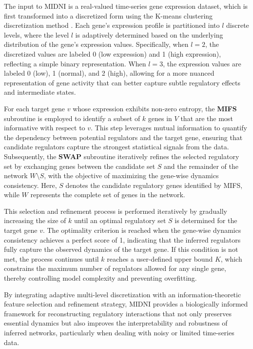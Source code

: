 The input to MIDNI is a real-valued time-series gene expression dataset, which is first transformed into a discretized form using the K-means clustering discretization method \parencite{MacQueen1967}. Each gene's expression profile is partitioned into \( l \) discrete levels, where the level \( l \) is adaptively determined based on the underlying distribution of the gene’s expression values. Specifically, when \( l = 2 \), the discretized values are labeled 0 (low expression) and 1 (high expression), reflecting a simple binary representation. When \( l = 3 \), the expression values are labeled 0 (low), 1 (normal), and 2 (high), allowing for a more nuanced representation of gene activity that can better capture subtle regulatory effects and intermediate states.

For each target gene \( v \) whose expression exhibits non-zero entropy, the \textbf{MIFS} subroutine is employed to identify a subset of \( k \) genes in \( V \) that are the most informative with respect to \( v \). This step leverages mutual information to quantify the dependency between potential regulators and the target gene, ensuring that candidate regulators capture the strongest statistical signals from the data. Subsequently, the \textbf{SWAP} subroutine iteratively refines the selected regulatory set by exchanging genes between the candidate set \( S \) and the remainder of the network \( W \setminus S \), with the objective of maximizing the gene-wise dynamics consistency. Here, \( S \) denotes the candidate regulatory genes identified by MIFS, while \( W \) represents the complete set of genes in the network.

This selection and refinement process is performed iteratively by gradually increasing the size of \( k \) until an optimal regulatory set \( S \) is determined for the target gene \( v \). The optimality criterion is reached when the gene-wise dynamics consistency achieves a perfect score of 1, indicating that the inferred regulators fully capture the observed dynamics of the target gene. If this condition is not met, the process continues until \( k \) reaches a user-defined upper bound \( K \), which constrains the maximum number of regulators allowed for any single gene, thereby controlling model complexity and preventing overfitting.

By integrating adaptive multi-level discretization with an information-theoretic feature selection and refinement strategy, MIDNI provides a biologically informed framework for reconstructing regulatory interactions that not only preserves essential dynamics but also improves the interpretability and robustness of inferred networks, particularly when dealing with noisy or limited time-series data.

